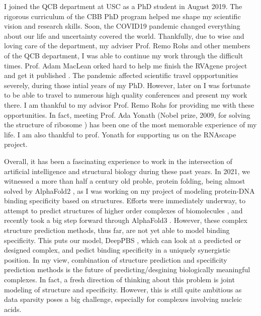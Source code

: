 I joined the QCB department at USC as a PhD student in August 2019. The rigorous curriculum of the CBB PhD program helped me shape my scientific vision and research skills. Soon, the COVID19 pandemic changed everything about our life and uncertainty covered the world. Thankfully, due to wise and loving care of the department, my adviser Prof. Remo Rohs and other members of the QCB department, I was able to continue my work through the difficult times. Prof. Adam MacLean orked hard to help me finish the RVAgene project and get it published \citep{Mitra2021}. The pandemic affected scientific travel oppportunities severely, during those intial years of my PhD. However, later on I was fortunate to be able to travel to numerous high quality conferences and present my work there. I am thankful to my advisor Prof. Remo Rohs for providing me with these opportunities. In fact, meeting Prof. Ada Yonath (Nobel prize, 2009, for solving the structure of ribosome \citep{schluenzen2000structure, harms2001high}) has been one of the most memorable experience of my life. I am also thankful to prof. Yonath for supporting us on the RNAscape project. 


Overall, it has been a fascinating experience to work in the intersection of artificial intelligence and structural biology during these past years. In 2021, we witnessed a more than half a century old proble, protein folding, being almost solved by AlphaFold2 \citep{Jumper2021}, as I was working on my project of modeling protein-DNA binding specificity based on structures. Efforts were immediately underway, to attempt to predict structures of higher order complexes of biomolecules \citep{evans2021protein,baek2024na}, and recently took a big step forward through AlphaFold3 \citep{Abramson2024}. However, these complex structure prediction methods, thus far, are not yet able to model binding specificity. This puts our model, DeepPBS \citep{Mitra2024}, which can look at a predicted or designed complex, and pedict binding specificity in a uniquely synergistic position. In my view, combination of structure prediction and specificity prediction methods is the future of predicting/desgining biologically meaningful complexes. In fact, a fresh direction of thinking about this problem is joint modeling of structure and specificity. However, this is still quite ambitious as data sparsity poses a big challenge, especially for complexes involving nucleic acids. 

